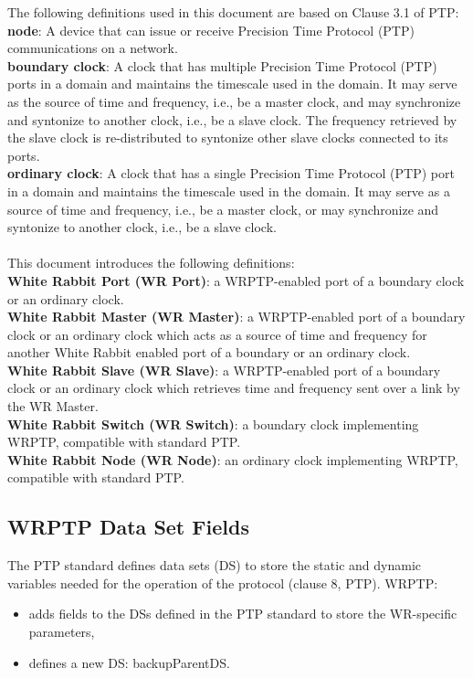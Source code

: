 \documentclass[a4paper, 12pt]{article}
\begin{document}
The following definitions used in this document are based on Clause 3.1 of PTP:\\
\textbf{node}:  A device that can issue or receive Precision Time Protocol (PTP) communications on a
network.\\
\textbf{boundary clock}: A clock that has multiple Precision Time Protocol (PTP) ports in a domain 
and maintains the timescale used in the domain. It may serve as the source of time and frequency, 
i.e., be a master clock, and may synchronize and syntonize to another clock, 
i.e., be a slave clock. The frequency retrieved by the slave clock is re-distributed 
to syntonize other slave clocks connected to its ports.\\
\textbf{ordinary clock}: A clock that has a single Precision Time Protocol (PTP) port in a domain 
and maintains the timescale used in the domain. It may serve as a source of time and frequency, 
i.e., be a master clock, or may synchronize and syntonize to another clock, 
i.e., be a slave clock.\\
\\
This document introduces the following definitions:\\
\textbf{White Rabbit Port (WR Port)}: a WRPTP-enabled port of a boundary clock 
or an ordinary clock.\\
\textbf{White Rabbit Master (WR Master)}: a WRPTP-enabled port of a boundary clock or an 
ordinary clock which acts as a source of time and frequency for another White Rabbit enabled port of 
a boundary or an ordinary clock.\\
\textbf{White Rabbit Slave (WR Slave)}: a WRPTP-enabled port of a boundary clock or an 
ordinary clock which retrieves time and frequency sent over a link by 
the WR Master.\\
\textbf{White Rabbit Switch (WR Switch)}: a boundary clock implementing WRPTP, compatible with 
standard PTP. \\
\textbf{White Rabbit Node (WR Node)}: an ordinary clock implementing WRPTP, compatible with 
standard PTP. \\





\subsection{WRPTP Data Set Fields}
\label{sec:wrDS}

The PTP standard defines data sets (DS) to store the static and dynamic variables needed for  the
operation of the protocol (clause 8, PTP). WRPTP:
\begin{itemize}
  \item adds fields to the DSs defined in the PTP standard to store the WR-specific parameters,
  \item defines a new DS: backupParentDS. 
\end{itemize}
\end{document}
